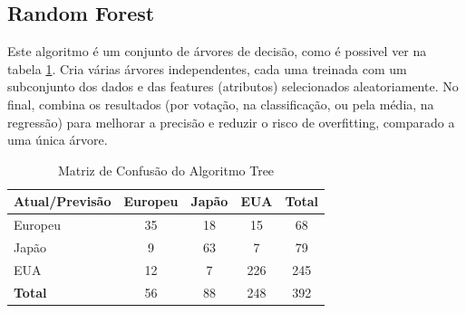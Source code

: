 \documentclass[conference]{IEEEtran}
\begin{document}
\subsection{Random Forest}
Este algoritmo é um conjunto de árvores de decisão, como é possivel ver na tabela \ref{tab:conf_matrix_forest}. Cria várias árvores
independentes, cada uma treinada com um subconjunto dos dados e das features (atributos) selecionados aleatoriamente. No final,
combina os resultados (por votação, na classificação, ou pela média, na regressão) para melhorar a precisão e reduzir o risco de
overfitting, comparado a uma única árvore.
\begin{table}[!ht]
	\centering
	\begin{tabular}{lcccc}
		\toprule
		\textbf{Atual/Previsão} & \textbf{Europeu} & \textbf{Japão} & \textbf{EUA} & \textbf{Total} \\
		\midrule
		Europeu                 & 35               & 18             & 15           & 68             \\
		Japão                   & 9                & 63             & 7            & 79             \\
		EUA                     & 12               & 7              & 226          & 245            \\
		\midrule
		\textbf{Total}          & 56               & 88             & 248          & 392            \\
		\bottomrule
	\end{tabular}
	\caption{Matriz de Confusão do Algoritmo Tree}
	\label{tab:conf_matrix_forest}

\end{table}

\end{document}
